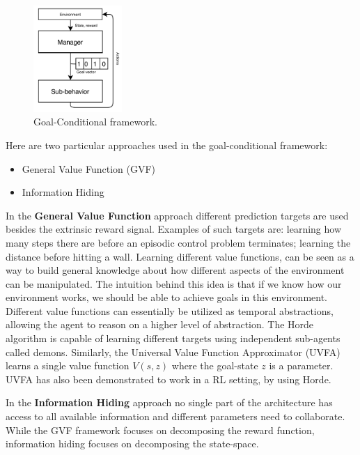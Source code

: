 \begin{figure}
    \centering
    \includegraphics[width=0.3\textwidth]{Images/goal-conditional.png}
    \caption{Goal-Conditional framework.}
    \label{fig:goal-conditional}
\end{figure}

Here are two particular approaches used in the goal-conditional framework:

\begin{itemize}
    \item General Value Function (GVF)
    \item Information Hiding
\end{itemize}

In the \textbf{General Value Function} \cite{Horde} approach different prediction targets are used besides the extrinsic reward signal.
Examples of such targets are: learning how many steps there are
before an episodic control problem terminates; learning the distance before hitting a wall.
Learning different value functions, can be seen as a way to build general knowledge about
how different aspects of the environment can be manipulated. The intuition behind this
idea is that if we know how our environment works, we should be able to achieve
goals in this environment. Different value functions can essentially be utilized as temporal
abstractions, allowing the agent to reason on a higher level of abstraction.
The Horde algorithm \cite{Horde} is capable of learning different targets using independent sub-agents called demons.
Similarly, the Universal Value Function Approximator (UVFA) learns a single value function $V(s, z)$ where the goal-state $z$ is a parameter.
UVFA has also been demonstrated to work in a RL setting, by using Horde.

In the \textbf{Information Hiding} \cite{Feudal_rl} approach no single part of the architecture has access to all available information and different parameters
need to collaborate. While the GVF framework focuses on decomposing the reward function, information hiding focuses on decomposing the state-space.


